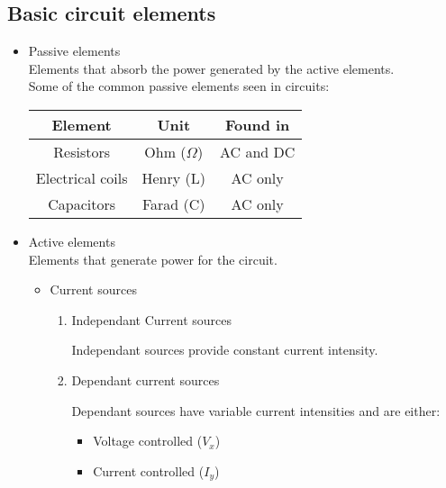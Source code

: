 \documentclass[a4paper]{book}
\begin{document}
\subsection{Basic circuit elements}

\begin{itemize}


  \item Passive elements \\
    Elements that absorb the power generated by the active elements.\\
    Some of the common passive elements seen in circuits:

    \begin{center}
      \begin{tabular}{| c | c | c |}

        \hline
        Element & Unit & Found in \\ \hline \hline
        Resistors & Ohm ($\Omega$) & AC and DC \\ \hline
        Electrical coils & Henry (L) & AC only \\ \hline
        Capacitors & Farad (C) & AC only\\
        \hline

      \end{tabular}
    \end{center}

  \item Active elements \\ Elements that generate power for the circuit.

    \begin{itemize}

      \item Current sources

        \begin{enumerate}

          \item Independant Current sources

            Independant sources provide constant current intensity.

          \item Dependant current sources

            Dependant sources have variable current intensities and are either:

            \begin{itemize}

              \item Voltage controlled ($V_x$)

              \item Current controlled ($I_y$)

            \end{itemize}

        \end{enumerate}

    \end{itemize}

\end{itemize}
\end{document}
